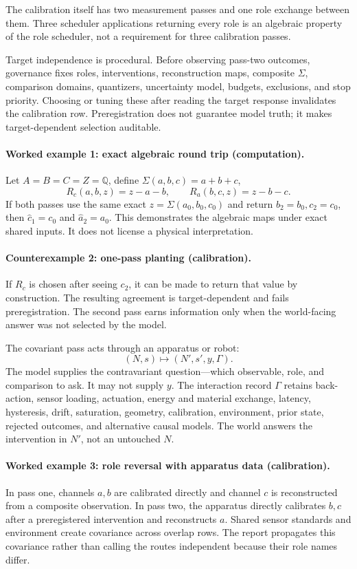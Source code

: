 The calibration itself has two measurement passes and one role exchange between them.  Three scheduler applications
returning every role is an algebraic property of the role scheduler, not a requirement for three calibration passes.

Target independence is procedural.  Before observing pass-two outcomes, governance fixes roles, interventions,
reconstruction maps, composite \(\Sigma\), comparison domains, quantizers, uncertainty model, budgets, exclusions,
and stop priority.  Choosing or tuning these after reading the target response invalidates the calibration row.
Preregistration does not guarantee model truth; it makes target-dependent selection auditable.

\paragraph{Worked example 1: exact algebraic round trip (computation).}
Let \(A=B=C=Z=\mathbb Q\), define \(\Sigma(a,b,c)=a+b+c\),
\[
R_c(a,b,z)=z-a-b,\qquad R_a(b,c,z)=z-b-c.
\]
If both passes use the same exact \(z=\Sigma(a_0,b_0,c_0)\) and return \(b_2=b_0,c_2=c_0\), then
\(\widehat c_1=c_0\) and \(\widehat a_2=a_0\).  This demonstrates the algebraic maps under exact shared inputs.  It
does not license a physical interpretation.

\paragraph{Counterexample 2: one-pass planting (calibration).}
If \(R_c\) is chosen after seeing \(c_2\), it can be made to return that value by construction.  The resulting
agreement is target-dependent and fails preregistration.  The second pass earns information only when the world-facing
answer was not selected by the model.

The covariant pass acts through an apparatus or robot:
\[
                         (N,s)\longmapsto(N',s',y,\Gamma).
\]
The model supplies the contravariant question---which observable, role, and comparison to ask.  It may not supply
\(y\).  The interaction record \(\Gamma\) retains back-action, sensor loading, actuation, energy and material
exchange, latency, hysteresis, drift, saturation, geometry, calibration, environment, prior state, rejected outcomes,
and alternative causal models.  The world answers the intervention in \(N'\), not an untouched \(N\).

\paragraph{Worked example 3: role reversal with apparatus data (calibration).}
In pass one, channels \(a,b\) are calibrated directly and channel \(c\) is reconstructed from a composite observation.
In pass two, the apparatus directly calibrates \(b,c\) after a preregistered intervention and reconstructs \(a\).
Shared sensor standards and environment create covariance across overlap rows.  The report propagates this covariance
rather than calling the routes independent because their role names differ.

